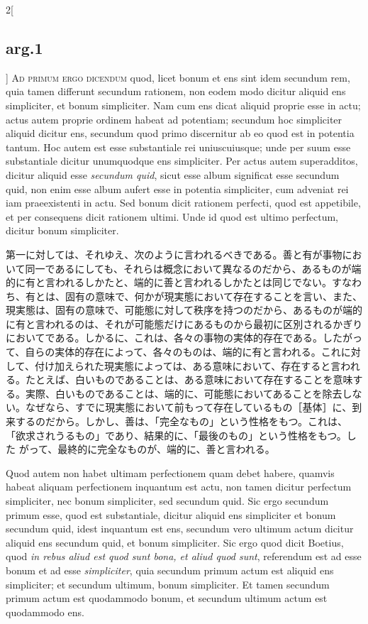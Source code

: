 \documentclass[paper=a4paper,fontsize=10pt,jafontsize=9pt,titlepage]{jlreq}
\begin{document}
\begin{paracol}{2}[\subsection{arg.1}]
{\scshape Ad primum ergo dicendum} quod, licet bonum et ens sint idem
 secundum rem, quia tamen differunt secundum rationem, non eodem modo
 dicitur aliquid ens simpliciter, et bonum simpliciter.  Nam cum ens
 dicat aliquid proprie esse in actu; actus autem proprie ordinem habeat
 ad potentiam; secundum hoc simpliciter aliquid dicitur ens, secundum
 quod primo discernitur ab eo quod est in potentia tantum.  Hoc autem
 est esse substantiale rei uniuscuiusque; unde per suum esse
 substantiale dicitur unumquodque ens simpliciter.  Per actus autem
 superadditos, dicitur aliquid esse {\itshape secundum quid}, sicut esse
 album significat esse secundum quid, non enim esse album aufert esse in
 potentia simpliciter, cum adveniat rei iam praeexistenti in actu.
Sed bonum dicit rationem perfecti, quod est appetibile, et per
 consequens dicit rationem ultimi. 
Unde id quod est ultimo perfectum, dicitur bonum simpliciter.

\switchcolumn

第一に対しては、それゆえ、次のように言われるべきである。善と有が事物にお
 いて同一であるにしても、それらは概念において異なるのだから、あるものが端
 的に有と言われるしかたと、端的に善と言われるしかたとは同じでない。すなわ
 ち、有とは、固有の意味で、何かが現実態において存在することを言い、また、
 現実態は、固有の意味で、可能態に対して秩序を持つのだから、あるものが端的
 に有と言われるのは、それが可能態だけにあるものから最初に区別されるかぎり
 においてである。しかるに、これは、各々の事物の実体的存在である。したがっ
 て、自らの実体的存在によって、各々のものは、端的に有と言われる。これに対
 して、付け加えられた現実態によっては、ある意味において、存在すると言われ
 る。たとえば、白いものであることは、ある意味において存在することを意味す
 る。実際、白いものであることは、端的に、可能態においてあることを除去しな
 い。なぜなら、すでに現実態において前もって存在しているもの［基体］に、到
 来するのだから。しかし、善は、「完全なもの」という性格をもつ。これは、
 「欲求されうるもの」であり、結果的に、「最後のもの」という性格をもつ。した
 がって、最終的に完全なものが、端的に、善と言われる。

\switchcolumn*

Quod autem non habet ultimam perfectionem quam debet habere, quamvis
 habeat aliquam perfectionem inquantum est actu, non tamen dicitur
 perfectum simpliciter, nec bonum simpliciter, sed secundum quid.  Sic
 ergo secundum primum esse, quod est substantiale, dicitur aliquid ens
 simpliciter et bonum secundum quid, idest inquantum est ens, secundum
 vero ultimum actum dicitur aliquid ens secundum quid, et bonum
 simpliciter.  Sic ergo quod dicit Boetius, quod {\itshape in rebus
 aliud est quod sunt bona, et aliud quod sunt}, referendum est ad esse
 bonum et ad esse {\itshape simpliciter}, quia secundum primum actum est
 aliquid ens simpliciter; et secundum ultimum, bonum simpliciter. Et
 tamen secundum primum actum est quodammodo bonum, et secundum ultimum
 actum est quodammodo ens.


\end{paracol}
\end{document}
